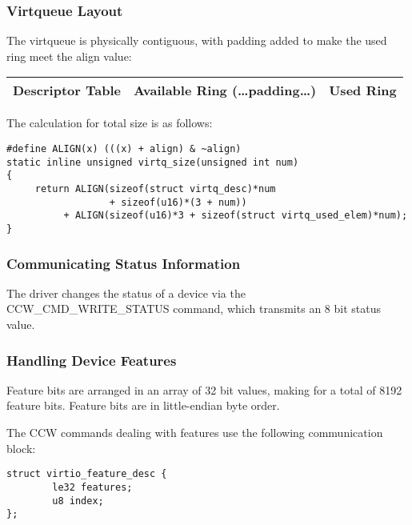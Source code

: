 \subsubsection{Virtqueue Layout}\label{sec:Virtio Transport Options / Virtio over channel I/O / Device Initialization / Virtqueue Layout}

The virtqueue is physically contiguous, with padding added to make the
used ring meet the align value:

\begin{tabular}{|l|l|l|}
\hline
Descriptor Table & Available Ring (\ldots padding\ldots) & Used Ring \\
\hline
\end{tabular}

The calculation for total size is as follows:

\begin{lstlisting}
#define ALIGN(x) (((x) + align) & ~align)
static inline unsigned virtq_size(unsigned int num)
{
     return ALIGN(sizeof(struct virtq_desc)*num
                  + sizeof(u16)*(3 + num))
          + ALIGN(sizeof(u16)*3 + sizeof(struct virtq_used_elem)*num);
}
\end{lstlisting}

\subsubsection{Communicating Status Information}\label{sec:Virtio Transport Options / Virtio over channel I/O / Device Initialization / Communicating Status Information}

The driver changes the status of a device via the
CCW_CMD_WRITE_STATUS command, which transmits an 8 bit status
value.

\subsubsection{Handling Device Features}\label{sec:Virtio Transport Options / Virtio over channel I/O / Device Initialization / Handling Device Features}

Feature bits are arranged in an array of 32 bit values, making
for a total of 8192 feature bits. Feature bits are in
little-endian byte order.

The CCW commands dealing with features use the following
communication block:

\begin{lstlisting}
struct virtio_feature_desc {
        le32 features;
        u8 index;
};
\end{lstlisting}

